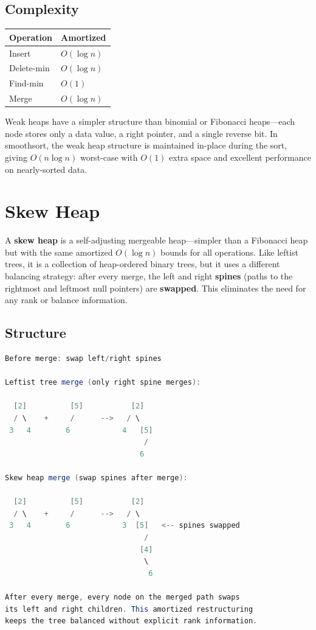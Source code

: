 \subsection{Complexity}

\begin{center}
\begin{tabular}{ll}
\hline
\textbf{Operation} & \textbf{Amortized} \\
\hline
Insert          & $O(\log n)$ \\
Delete-min      & $O(\log n)$ \\
Find-min        & $O(1)$ \\
Merge           & $O(\log n)$ \\
\hline
\end{tabular}
\end{center}

Weak heaps have a simpler structure than binomial or Fibonacci heaps---each node stores only a data value, a right pointer, and a single reverse bit. In smoothsort, the weak heap structure is maintained in-place during the sort, giving $O(n \log n)$ worst-case with $O(1)$ extra space and excellent performance on nearly-sorted data.

\section{Skew Heap}

A \textbf{skew heap} is a self-adjusting mergeable heap---simpler than a Fibonacci heap but with the same amortized $O(\log n)$ bounds for all operations. Like leftist trees, it is a collection of heap-ordered binary trees, but it uses a different balancing strategy: after every merge, the left and right \textbf{spines} (paths to the rightmost and leftmost null pointers) are \textbf{swapped}. This eliminates the need for any rank or balance information.

\subsection{Structure}

\begin{lstlisting}[language=Java]
Before merge: swap left/right spines

Leftist tree merge (only right spine merges):

  [2]          [5]           [2]
  / \    +     /      -->   / \
 3   4        6            4   [5]
                                /
                               6

Skew heap merge (swap spines after merge):

  [2]          [5]           [2]
  / \    +     /      -->   / \
 3   4        6            3  [5]   <-- spines swapped
                                /
                               [4]
                                \
                                 6

After every merge, every node on the merged path swaps
its left and right children. This amortized restructuring
keeps the tree balanced without explicit rank information.
\end{lstlisting}

